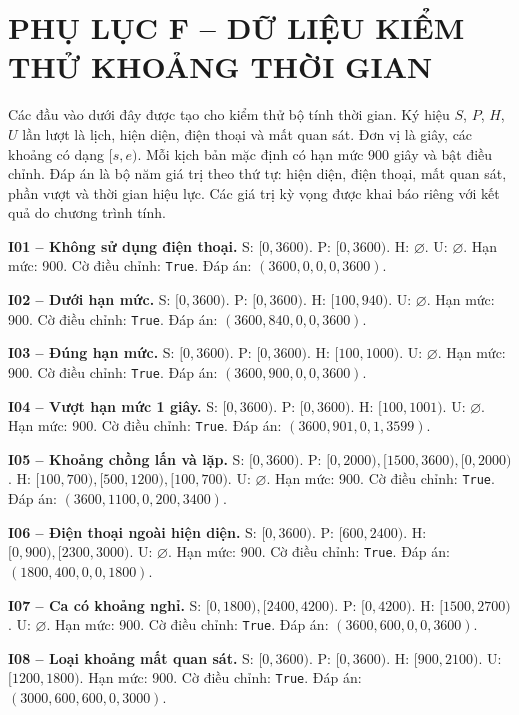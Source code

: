 \clearpage
\section*{PHỤ LỤC F -- DỮ LIỆU KIỂM THỬ KHOẢNG THỜI GIAN}
Các đầu vào dưới đây được tạo cho kiểm thử bộ tính thời gian. Ký hiệu $S$, $P$, $H$, $U$ lần lượt là lịch, hiện diện, điện thoại và mất quan sát. Đơn vị là giây, các khoảng có dạng $[s,e)$. Mỗi kịch bản mặc định có hạn mức 900 giây và bật điều chỉnh. Đáp án là bộ năm giá trị theo thứ tự: hiện diện, điện thoại, mất quan sát, phần vượt và thời gian hiệu lực. Các giá trị kỳ vọng được khai báo riêng với kết quả do chương trình tính.

\noindent\textbf{I01 -- Không sử dụng điện thoại.}
S: $[0,3600)$.
P: $[0,3600)$.
H: $\varnothing$.
U: $\varnothing$.
Hạn mức: 900. Cờ điều chỉnh: \texttt{True}. Đáp án: $(3600, 0, 0, 0, 3600)$.

\noindent\textbf{I02 -- Dưới hạn mức.}
S: $[0,3600)$.
P: $[0,3600)$.
H: $[100,940)$.
U: $\varnothing$.
Hạn mức: 900. Cờ điều chỉnh: \texttt{True}. Đáp án: $(3600, 840, 0, 0, 3600)$.

\noindent\textbf{I03 -- Đúng hạn mức.}
S: $[0,3600)$.
P: $[0,3600)$.
H: $[100,1000)$.
U: $\varnothing$.
Hạn mức: 900. Cờ điều chỉnh: \texttt{True}. Đáp án: $(3600, 900, 0, 0, 3600)$.

\noindent\textbf{I04 -- Vượt hạn mức 1 giây.}
S: $[0,3600)$.
P: $[0,3600)$.
H: $[100,1001)$.
U: $\varnothing$.
Hạn mức: 900. Cờ điều chỉnh: \texttt{True}. Đáp án: $(3600, 901, 0, 1, 3599)$.

\noindent\textbf{I05 -- Khoảng chồng lấn và lặp.}
S: $[0,3600)$.
P: $[0,2000), [1500,3600), [0,2000)$.
H: $[100,700), [500,1200), [100,700)$.
U: $\varnothing$.
Hạn mức: 900. Cờ điều chỉnh: \texttt{True}. Đáp án: $(3600, 1100, 0, 200, 3400)$.

\noindent\textbf{I06 -- Điện thoại ngoài hiện diện.}
S: $[0,3600)$.
P: $[600,2400)$.
H: $[0,900), [2300,3000)$.
U: $\varnothing$.
Hạn mức: 900. Cờ điều chỉnh: \texttt{True}. Đáp án: $(1800, 400, 0, 0, 1800)$.

\noindent\textbf{I07 -- Ca có khoảng nghỉ.}
S: $[0,1800), [2400,4200)$.
P: $[0,4200)$.
H: $[1500,2700)$.
U: $\varnothing$.
Hạn mức: 900. Cờ điều chỉnh: \texttt{True}. Đáp án: $(3600, 600, 0, 0, 3600)$.

\noindent\textbf{I08 -- Loại khoảng mất quan sát.}
S: $[0,3600)$.
P: $[0,3600)$.
H: $[900,2100)$.
U: $[1200,1800)$.
Hạn mức: 900. Cờ điều chỉnh: \texttt{True}. Đáp án: $(3000, 600, 600, 0, 3000)$.

